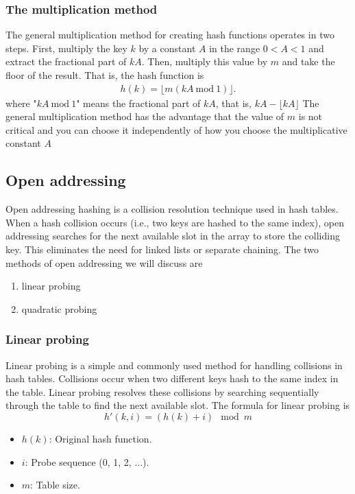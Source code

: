 \documentclass{report}
\begin{document}
\bigbreak \noindent 
\subsubsection{The multiplication method}
\bigbreak \noindent 
The general multiplication method for creating hash functions operates in two steps. First, multiply the key \( k \) by a constant \( A \) in the range \( 0 < A < 1 \) and extract the fractional part of \( kA \). Then, multiply this value by \( m \) and take the floor of the result. That is, the hash function is
\begin{align*}
    h(k) = \lfloor m (kA \ \text{mod} \ 1) \rfloor
.\end{align*}
\bigbreak \noindent 
where "$kA \ \text{mod} \ 1$" means the fractional part of $kA$, that is, $kA - \lfloor kA \rfloor $
\bigbreak \noindent 
The general multiplication method has the advantage that the value of $m$ is not critical and you can choose it independently of how you choose the multiplicative constant $A$


\bigbreak \noindent 
\subsection{Open addressing}
\bigbreak \noindent 
Open addressing hashing is a collision resolution technique used in hash tables. When a hash collision occurs (i.e., two keys are hashed to the same index), open addressing searches for the next available slot in the array to store the colliding key. This eliminates the need for linked lists or separate chaining.
\bigbreak \noindent 
The two methods of open addressing we will discuss are
\begin{enumerate}
    \item linear probing
    \item quadratic probing
\end{enumerate}




\bigbreak \noindent 
\subsubsection{Linear probing}
\bigbreak \noindent 
Linear probing is a simple and commonly used method for handling collisions in hash tables. Collisions occur when two different keys hash to the same index in the table. Linear probing resolves these collisions by searching sequentially through the table to find the next available slot.
\bigbreak \noindent 
The formula for linear probing is
\[
    h'(k, i) = (h(k) + i) \mod m
\]
\begin{itemize}
    \item \(h(k)\): Original hash function.
    \item \(i\): Probe sequence (0, 1, 2, ...).
    \item \(m\): Table size.
\end{itemize}
\end{document}
